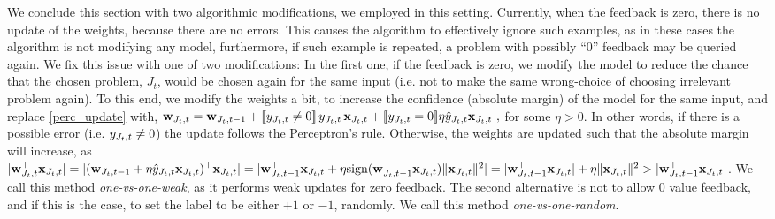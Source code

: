 We conclude this section with two algorithmic modifications, we employed in this setting. Currently, when the feedback is zero, there is no update of the weights, because there are no errors. This causes the algorithm to effectively ignore such examples, as in these cases the algorithm is not modifying any model, furthermore, if such example is repeated, a problem with possibly ``0'' feedback may be queried again.
%
We fix this issue with one of two modifications: In the first one, if the feedback is zero, we modify the model to reduce the chance that the chosen problem, $J_t$, would be chosen again for the same input (i.e. not to make the same wrong-choice of choosing irrelevant problem again). To this end, we modify the weights a bit, to increase the confidence (absolute margin) of the model for the same input, and replace \eqref{perc_update} with,
\(
\mathbf{w}_{J_t,t} = \mathbf{w}_{J_t,t-1}+ [\![{y_{J_t,t}\ne0}]\!] \, y_{J_t,t}\, \mathbf{x}_{J_t,t} +
 [\![{y_{J_t,t}=0}]\!] \eta \hat{y}_{J_t,t}\mathbf{x}_{J_t,t}~,
\)
for some $\eta>0$. In other words, if there is a possible error (i.e. $y_{J_t,t}\ne0$) the update follows the Perceptron's rule. Otherwise, the weights are updated such that the absolute margin will increase, as $\vert {\mathbf{w}}^{\top}_{J_t,t} \mathbf{x}_{J_t,t} \vert = \vert
(\mathbf{w}_{J_t,t-1}+ \eta \hat{y}_{J_t,t}\mathbf{x}_{J_t,t})^\top\mathbf{x}_{J_t,t}\vert = \vert {\mathbf{w}}^{\top}_{J_t,t-1}\mathbf{x}_{J_t,t}+ \eta {\rm sign}({\mathbf{w}}^{\top}_{J_t,t-1}\mathbf{x}_{J_t,t}) \Vert\mathbf{x}_{J_t,t}\Vert^2 \vert =
\vert {\mathbf{w}}^{\top}_{J_t,t-1}\mathbf{x}_{J_t,t}\vert + \eta \Vert\mathbf{x}_{J_t,t}\Vert^2 > \vert {\mathbf{w}}^{\top}_{J_t,t-1}\mathbf{x}_{J_t,t}\vert$. We call this method {\em one-vs-one-weak}, as it performs weak updates for zero feedback. The second alternative is not to allow $0$ value feedback, and if this is the case, to set the label to be either $+1$ or $-1$, randomly.
We call this method {\em one-vs-one-random}.

